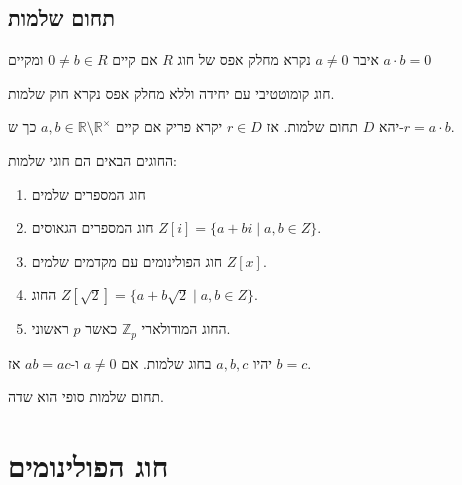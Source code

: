 \documentclass{tstextbook}
\begin{document}
\subsection{תחום שלמות}

\begin{definition}
איבר \(a\neq 0\) נקרא מחלק אפס של חוג \(R\) אם קיים \(0\neq b \in R\) ומקיים \(a\cdot b =0\)

\end{definition}
\begin{definition}
חוג קומוטטיבי עם יחידה וללא מחלק אפס נקרא חוק שלמות.

\end{definition}
\begin{definition}[פריקות]
יהא \(D\) תחום שלמות. אז \(r \in D\) יקרא פריק אם קיים \(a,b \in \mathbb{R} \setminus \mathbb{R}^\times\) כך ש-\(r=a\cdot b\).

\end{definition}
\begin{example}
החוגים הבאים הם חוגי שלמות:

  \begin{enumerate}
    \item חוג המספרים שלמים 


    \item חוג המספרים הגאוסים \(Z[i]=\{a+b i\mid a,b\in Z\}\). 


    \item חוג הפולינומים עם מקדמים שלמים \(Z[x]\). 


    \item החוג \(Z[{\sqrt{2}}]=\{a+b{\sqrt{2}}\mid a,b\in Z\}\). 


    \item החוג המודולארי \(\mathbb{Z}_{p}\) כאשר \(p\) ראשוני. 


  \end{enumerate}
\end{example}
\begin{proposition}
יהיו \(a,b,c\) בחוג שלמות. אם \(a\neq 0\) ו-\(ab=ac\) אז \(b=c\).

\end{proposition}
\begin{proposition}
תחום שלמות סופי הוא שדה.

\end{proposition}
\section{חוג הפולינומים}
\end{document}
